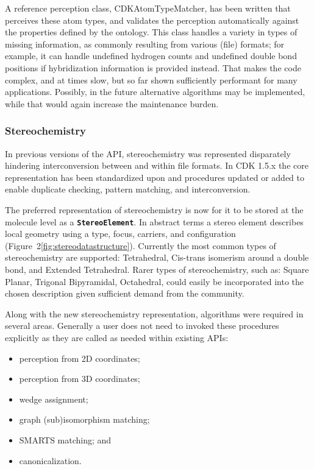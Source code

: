 \documentclass[10pt]{bmcart}
\begin{document}
  A reference perception class, CDKAtomTypeMatcher, has been written that perceives these atom types, and
  validates the perception automatically against the properties defined by the ontology.
  This class handles a variety in types of missing information, as commonly resulting
  from various (file) formats; for example, it can handle undefined hydrogen counts
  and undefined double bond positions if hybridization information is provided instead.
  That makes the code complex, and at times slow, but so far shown sufficiently
  performant for many applications. Possibly, in the future
  alternative algorithms may be implemented, while that would again increase the maintenance
  burden.

  \subsubsection*{Stereochemistry}

  In previous versions of the API, stereochemistry was represented disparately hindering 
  interconversion between and within file formats. In CDK 1.5.x the core representation 
  has been standardized upon and procedures updated or added to enable duplicate checking,
  pattern matching, and interconversion.

  The preferred representation of stereochemistry is now for it to be stored at the molecule
  level as a \texttt{\textbf{StereoElement}}. In abstract terms a stereo element describes local
  geometry using a type, focus, carriers, and configuration (Figure~2\ref{fig:stereodatastructure}).
  Currently the most common types of stereochemistry are supported: Tetrahedral, Cis-trans isomerism 
  around a double bond, and Extended Tetrahedral. Rarer types of stereochemistry, such as: Square 
  Planar, Trigonal Bipyramidal, Octahedral, could easily be incorporated into the chosen description 
  given sufficient demand from the community.


  Along with the new stereochemistry representation, algorithms were required in several areas. Generally
  a user does not need to invoked these procedures explicitly as they are called as needed within existing
  APIs:

  \begin{itemize}
   \item perception from 2D coordinates;
   \item perception from 3D coordinates;
   \item wedge assignment;
   \item graph (sub)isomorphism matching;
   \item SMARTS matching; and
   \item canonicalization.
  \end{itemize}
\end{document}
